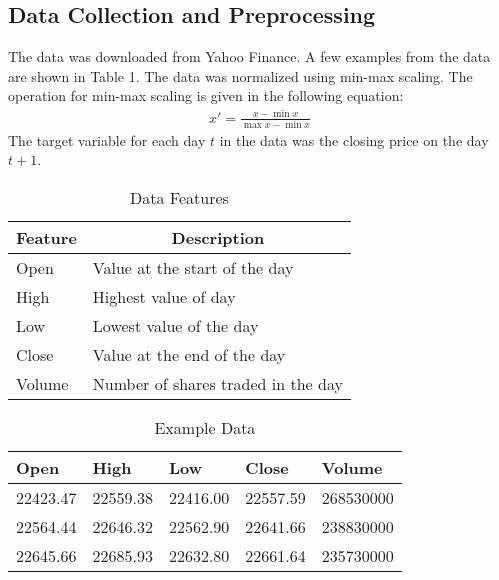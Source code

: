 \documentclass[acmtog, authorversion]{acmart}
\begin{document}
\subsection{Data Collection and Preprocessing}
The data was downloaded from Yahoo Finance. A few examples from the data are shown in Table 1. The data was normalized using min-max scaling. The operation for min-max scaling is given in the following equation:
\begin{gather}
    x' = \frac{x - \min x}{\max x - \min x}
\end{gather}
The target variable for each day $t$ in the data was the closing price on the day $t+1$.

\begin{table}[h]
\centering
\caption{Data Features}
\begin{tabular}{p{2.5cm}p{4cm}}

\toprule
\multicolumn{1}{c}{\textbf{Feature}} & \multicolumn{1}{c}{\textbf{Description}}                  \\ \midrule
Open                           & Value at the start of the day         \\
High                           & Highest value of day      \\
Low                           & Lowest value of the day                                     \\
Close                           & Value at the end of the day               \\
Volume                          & Number of shares traded in the day        \\ \bottomrule
\end{tabular}
\end{table}


\begin{table}[]
\centering
\caption{Example Data}
\begin{tabular}{@{}lllll@{}}
\toprule
\textbf{Open} & \textbf{High} & \textbf{Low} & \textbf{Close} & \textbf{Volume} \\ \midrule
22423.47 & 22559.38 & 22416.00 & 22557.59 & 268530000              \\
22564.44 & 22646.32 & 22562.90 & 22641.66 & 238830000              \\
22645.66 & 22685.93 & 22632.80 & 22661.64 & 235730000 \\ \bottomrule
\end{tabular}
\end{table}
\end{document}

